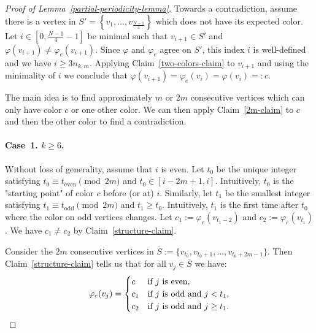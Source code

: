 \documentclass[a4paper,10pt,hidelinks]{amsart}
\renewcommand{\phi}{\ensuremath{\varphi}}
\theoremstyle{definition}
\begin{document}
\begin{proof}[Proof of Lemma~\ref{partial-periodicity-lemma}]
    Towards a contradiction, assume there is a vertex in $S'=\left\{v_1,\ldots,v_{\frac{N-1}{4}}\right\}$ which does not have its expected color. Let $i\in \left[0,\frac{N-1}{4}-1\right]$ be minimal such that $v_{i+1} \in S'$ and $\varphi(v_{i+1}) \neq \varphi_e(v_{i+1})$. Since $\phi$ and $\phi_e$ agree on $S'$, this index $i$ is well-defined and we have $i\ge 3n_{k,m}$. Applying Claim~\ref{two-colors-claim} to $v_{i+1}$ and using the minimality of $i$ we conclude that $\varphi(v_{i+1}) = \varphi_e(v_i) = \varphi(v_i) =: c$.


    The main idea is to find approximately $m$ or $2m$ consecutive vertices which can only have color $c$ or one other color. We can then apply Claim~\ref{2m-claim} to $c$ and then the other color to find a contradiction.
    
    \medskip

    \paragraph*{\textbf{Case~1.} $k \geq 6$.}


    Without loss of generality, assume that $i$ is even. Let $t_0$ be the unique integer satisfying $t_0 \equiv t_{\text{even}} \pmod{2m}$ and $t_0 \in [i - 2m + 1, i]$.  Intuitively, $t_0$ is the "starting point" of color $c$ before (or at) $i$. Similarly, let $t_1$ be the smallest integer satisfying $t_1 \equiv t_{\text{odd}} \pmod{2m}$ and $t_1 \geq t_0$. Intuitively, $t_1$ is the first time after $t_0$ where the color on odd vertices changes. Let $c_1 := \varphi_e(v_{t_1 - 2})$ and $c_2 := \varphi_e(v_{t_1})$. We have $c_1\neq c_2$ by Claim~\ref{structure-claim}.

    Consider the $2m$ consecutive vertices in $\overline{S} := \{v_{t_0}, v_{t_0 + 1}, \dots, v_{t_0+2m -1}\}$. Then Claim~\ref{structure-claim} tells us that for all $v_j \in \overline{S}$ we have:
    \begin{equation}\notag
        \varphi_e(v_j) = \begin{cases}
            c &\text{if } j \text{ is even},\\
            c_1 &\text{if } j \text{ is odd and } j < t_1, \\
            c_2 &\text{if } j \text{ is odd and } j \geq t_1.  
        \end{cases}
    \end{equation}


\end{proof}
\end{document}
